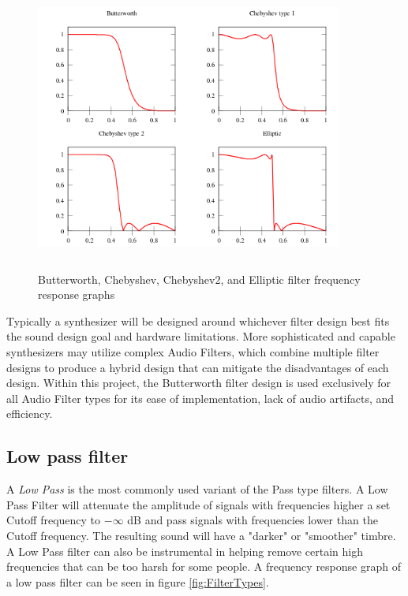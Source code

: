 \documentclass[a4paper,12pt]{report}
\begin{document}
\begin{figure}[h]
    \centering
    \includegraphics[width=0.9\textwidth,height=9.5cm]{FilterDesigns.png}
    \caption{Butterworth, Chebyshev, Chebyshev2, and Elliptic filter frequency response graphs \cite{linearfilter}}
    \label{fig:FilterDesigns}
\end{figure}

Typically a synthesizer will be designed around whichever filter design best fits the sound design goal and hardware limitations. More sophisticated and capable synthesizers may utilize complex Audio Filters, which combine multiple filter designs to produce a hybrid design that can mitigate the disadvantages of each design. Within this project, the Butterworth filter design is used exclusively for all Audio Filter types for its ease of implementation, lack of audio artifacts, and efficiency.

\subsection{Low pass filter}
\label{subsec:lowpassfilter}
A \emph{Low Pass } is the most commonly used variant of the Pass type filters. A Low Pass Filter will attenuate the amplitude of signals with frequencies higher a set Cutoff frequency to $-\infty$ dB and pass signals with frequencies lower than the Cutoff frequency. The resulting sound will have a "darker" or "smoother" timbre. A Low Pass filter can also be instrumental in helping remove certain high frequencies that can be too harsh for some people. A frequency response graph of a low pass filter can be seen in figure \ref{fig:FilterTypes}.
\end{document}
